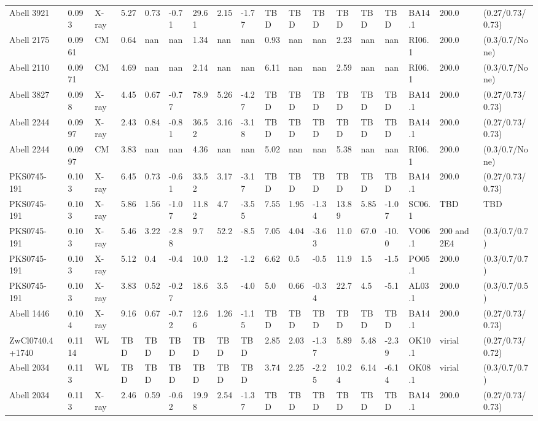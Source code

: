 \documentclass{article}
\begin{document}
\begin{center}
\begin{landscape}
\begin{longtable}{llllllllllllllllll}
Abell 3921 & 0.093 & X-ray & 5.27 & 0.73 & -0.71 & 29.61 & 2.15 & -1.77 & TBD & TBD & TBD & TBD & TBD & TBD & BA14.1 & 200.0 & (0.27/0.73/0.73) \\
Abell 2175 & 0.0961 & CM & 0.64 & nan & nan & 1.34 & nan & nan & 0.93 & nan & nan & 2.23 & nan & nan & RI06.1 & 200.0 & (0.3/0.7/None) \\
Abell 2110 & 0.0971 & CM & 4.69 & nan & nan & 2.14 & nan & nan & 6.11 & nan & nan & 2.59 & nan & nan & RI06.1 & 200.0 & (0.3/0.7/None) \\
Abell 3827 & 0.098 & X-ray & 4.45 & 0.67 & -0.77 & 78.9 & 5.26 & -4.27 & TBD & TBD & TBD & TBD & TBD & TBD & BA14.1 & 200.0 & (0.27/0.73/0.73) \\
Abell 2244 & 0.0997 & X-ray & 2.43 & 0.84 & -0.81 & 36.52 & 3.16 & -3.18 & TBD & TBD & TBD & TBD & TBD & TBD & BA14.1 & 200.0 & (0.27/0.73/0.73) \\
Abell 2244 & 0.0997 & CM & 3.83 & nan & nan & 4.36 & nan & nan & 5.02 & nan & nan & 5.38 & nan & nan & RI06.1 & 200.0 & (0.3/0.7/None) \\
PKS0745-191 & 0.103 & X-ray & 6.45 & 0.73 & -0.61 & 33.52 & 3.17 & -3.17 & TBD & TBD & TBD & TBD & TBD & TBD & BA14.1 & 200.0 & (0.27/0.73/0.73) \\
PKS0745-191 & 0.103 & X-ray & 5.86 & 1.56 & -1.07 & 11.82 & 4.7 & -3.55 & 7.55 & 1.95 & -1.34 & 13.89 & 5.85 & -1.07 & SC06.1 & TBD & TBD \\
PKS0745-191 & 0.103 & X-ray & 5.46 & 3.22 & -2.88 & 9.7 & 52.2 & -8.5 & 7.05 & 4.04 & -3.63 & 11.0 & 67.0 & -10.0 & VO06.1 & 200 and 2E4 & (0.3/0.7/0.7) \\
PKS0745-191 & 0.103 & X-ray & 5.12 & 0.4 & -0.4 & 10.0 & 1.2 & -1.2 & 6.62 & 0.5 & -0.5 & 11.9 & 1.5 & -1.5 & PO05.1 & 200.0 & (0.3/0.7/0.7) \\
PKS0745-191 & 0.103 & X-ray & 3.83 & 0.52 & -0.27 & 18.6 & 3.5 & -4.0 & 5.0 & 0.66 & -0.34 & 22.7 & 4.5 & -5.1 & AL03.1 & 200.0 & (0.3/0.7/0.5) \\
Abell 1446 & 0.104 & X-ray & 9.16 & 0.67 & -0.72 & 12.66 & 1.26 & -1.15 & TBD & TBD & TBD & TBD & TBD & TBD & BA14.1 & 200.0 & (0.27/0.73/0.73) \\
ZwCl0740.4+1740 & 0.1114 & WL & TBD & TBD & TBD & TBD & TBD & TBD & 2.85 & 2.03 & -1.37 & 5.89 & 5.48 & -2.39 & OK10.1 & virial & (0.27/0.73/0.72) \\
Abell 2034 & 0.113 & WL & TBD & TBD & TBD & TBD & TBD & TBD & 3.74 & 2.25 & -2.25 & 10.24 & 6.14 & -6.14 & OK08.1 & virial & (0.3/0.7/0.7) \\
Abell 2034 & 0.113 & X-ray & 2.46 & 0.59 & -0.62 & 19.98 & 2.54 & -1.37 & TBD & TBD & TBD & TBD & TBD & TBD & BA14.1 & 200.0 & (0.27/0.73/0.73) \\

\end{longtable}
\end{landscape}
\end{center}
\end{document}
